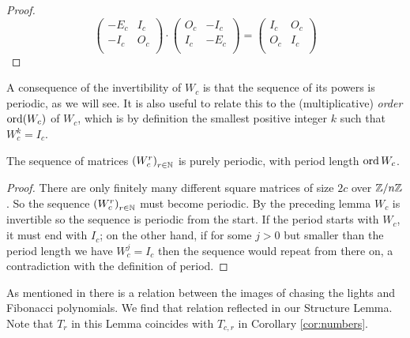 \begin{proof}
  \[
  \left(
  \begin{array}{cc}
    -E_c & I_c \\
    -I_c & O_c \\
  \end{array}
  \right)
  \cdot
  \left(
  \begin{array}{cc}
    O_c & -I_c  \\
    I_c & -E_c \\
  \end{array}
  \right)
  =
  \left(
  \begin{array}{cc}
    I_c & O_c \\
    O_c & I_c \\
  \end{array}
  \right)
  \]
\end{proof}
%
A consequence of the invertibility of $W_{c}$ is that the sequence of its powers
is periodic, as we will see. It is also useful to relate this to the
(multiplicative) {\it order} $\operatorname{ord}(W_c)$ of $W_c$,
which is by definition the smallest
positive integer $k$ such that $W_c^k=I_c$.

\begin{theorem}\label{thm:Wperiod}
The sequence of matrices $\left(W_{c}^{r}\right)_{r\in\mathbb{N}}$ is purely periodic, with
period length $\operatorname{ord} W_c$.
\end{theorem}

\begin{proof}
  There are only finitely many different square matrices of size $2c$ over
  $\mathbb{Z}/n\mathbb{Z}$. So the sequence $\left(W_{c}^{r}\right)_{r\in\mathbb{N}}$ must
  become periodic. By the preceding lemma $W_{c}$ is invertible so the
  sequence is periodic from the start. If the period starts with $W_c$, it
  must end with $I_c$; on the other hand, if for some $j>0$ but smaller than
  the period length we have $W_c^j=I_c$ then the sequence would repeat from
there on, a contradiction with the definition of period.
\end{proof}
%
As mentioned in \cite{leach17} there is a relation between the images of chasing
the lights and Fibonacci polynomials. We find that relation reflected in our
Structure Lemma. Note that $T_r$ in this Lemma coincides with
$T_{c,r}$ in Corollary \ref{cor:numbers}.


